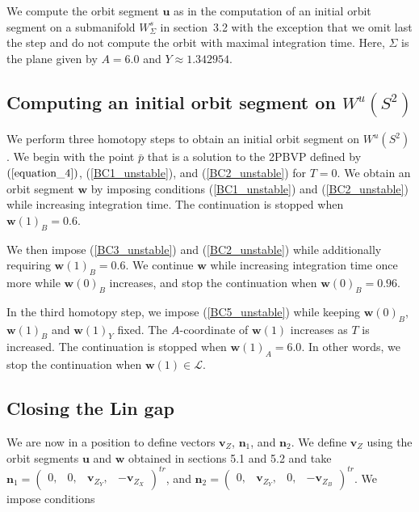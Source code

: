 \documentclass{ws-ijbc}
\begin{document}
We compute the orbit segment $\mathbf{u}$ as in the computation of an initial orbit segment on a submanifold $W^s_{\Sigma}$ in section~3.2 with the exception that we omit last the step and do not compute the orbit with maximal integration time.  Here, $\Sigma$ is the plane given by $A=6.0$ and $Y\approx1.342954$.

\subsection{Computing an initial orbit segment on $W^u(S^2)$}

We perform three homotopy steps to obtain an initial orbit segment on $W^u(S^2)$.  We begin with the point $\bar{p}$ that is a solution to the 2PBVP defined by $(\ref{equation_4})$, (\ref{BC1_unstable}), and (\ref{BC2_unstable}) for $T=0$.  We obtain an orbit segment $\mathbf{w}$ by imposing conditions (\ref{BC1_unstable}) and (\ref{BC2_unstable}) while increasing integration time.  The continuation is stopped when $\mathbf{w}(1)_B = 0.6$.

We then impose (\ref{BC3_unstable}) and (\ref{BC2_unstable}) while additionally requiring $\mathbf{w}(1)_B=0.6$.  We continue $\mathbf{w}$ while increasing integration time once more while $\mathbf{w}(0)_B$ increases, and stop the continuation when $\mathbf{w}(0)_B=0.96$.

In the third homotopy step, we impose (\ref{BC5_unstable}) while keeping $\mathbf{w}(0)_B$, $\mathbf{w}(1)_B$ and $\mathbf{w}(1)_Y$ fixed.  The $A$-coordinate of $\mathbf{w}(1)$ increases as $T$ is increased.  The continuation is stopped when $\mathbf{w}(1)_A = 6.0$.  In other words, we stop the continuation when $\mathbf{w}(1) \in \mathscr{L}$.

\subsection{Closing the Lin gap}

We are now in a position to define vectors $\mathbf{v}_Z$, $\mathbf{n}_1$, and $\mathbf{n}_2$.  We define $\mathbf{v}_Z$ using the orbit segments $\mathbf{u}$ and $\mathbf{w}$ obtained in sections 5.1 and 5.2 and take $\mathbf{n}_1 = \begin{pmatrix} 0, & 0, & \mathbf{v}_{Z_Y}, & -\mathbf{v}_{Z_X} \end{pmatrix}^{tr}$, and $\mathbf{n}_2 = \begin{pmatrix} 0, & \mathbf{v}_{Z_Y}, & 0, & -\mathbf{v}_{Z_B} \end{pmatrix}^{tr}$.  We impose conditions
\end{document}
